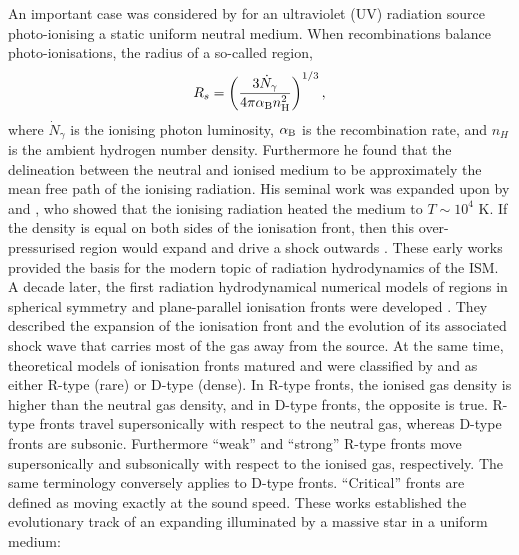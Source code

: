 \documentclass[useAMS,usenatbib]{mn2e}
\begin{document}
An important case was considered by \citet{Stroemgren39} for an
ultraviolet (UV) radiation source photo-ionising a static uniform
neutral medium.  When recombinations balance photo-ionisations, the
radius of a so-called \hii region,
%
\begin{equation}
  \label{eqn:Rstr}
  R_s = \left(\frac{3\dot{N}_\gamma}{4\pi \alpha_{\rm B} n_{\rm
        H}^2}\right)^{1/3},
\end{equation}
where $\dot{N}_\gamma$ is the ionising photon luminosity, $\alpha_{\rm
  B}$ is the recombination rate, and $n_H$ is the ambient hydrogen
number density.  Furthermore he found that the delineation between the
neutral and ionised medium to be approximately the mean free path of
the ionising radiation.  His seminal work was expanded upon by
\citet{Spitzer48, Spitzer49, Spitzer54} and \citet{Spitzer50}, who
showed that the ionising radiation heated the medium to $T \sim 10^4$
K.  If the density is equal on both sides of the ionisation front,
then this over-pressurised region would expand and drive a shock
outwards \citep[e.g.][]{Oort54, Schatzman55}.  These early works
provided the basis for the modern topic of radiation hydrodynamics of
the ISM.  A decade later, the first radiation hydrodynamical numerical
models of \hii regions in spherical symmetry and plane-parallel
ionisation fronts were developed \citep[e.g.][]{Mathews65, Lasker66,
  Hjellming66}.  They described the expansion of the ionisation front
and the evolution of its associated shock wave that carries most of
the gas away from the source.  At the same time, theoretical models of
ionisation fronts matured and were classified by \citet{Kahn54} and
\citet{Axford61} as either R-type (rare) or D-type (dense).  In R-type
fronts, the ionised gas density is higher than the neutral gas
density, and in D-type fronts, the opposite is true.  R-type fronts
travel supersonically with respect to the neutral gas, whereas D-type
fronts are subsonic.  Furthermore ``weak'' and ``strong'' R-type
fronts move supersonically and subsonically with respect to the
ionised gas, respectively.  The same terminology conversely applies to
D-type fronts.  ``Critical'' fronts are defined as moving exactly at
the sound speed.  These works established the evolutionary track of an
expanding \hii illuminated by a massive star in a uniform medium:
%
\end{document}
